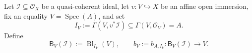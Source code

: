 \begin{definition}
  \label{def:nagata-global-blowup-local-model}

  Let $\mathcal I\subseteq\mathcal O_X$ be a quasi-coherent ideal, let
  $v\colon V\hookrightarrow X$ be an affine open immersion, fix an equality
  $V=\operatorname{Spec}(A)$, and set
  \[
    I_V:=\Gamma(V,v^*\mathcal I)\subseteq
      \Gamma(V,\mathcal O_V)=A.
  \]
  Define
  \[
    \mathsf B_V(\mathcal I):=\operatorname{Bl}_{I_V}(V),
    \qquad
    b_V:=b_{A,I_V}\colon\mathsf B_V(\mathcal I)\longrightarrow V.
  \]
\end{definition}

\begin{definition}
  \label{def:nagata-global-blowup-overlap-basic-map}


\end{definition}
